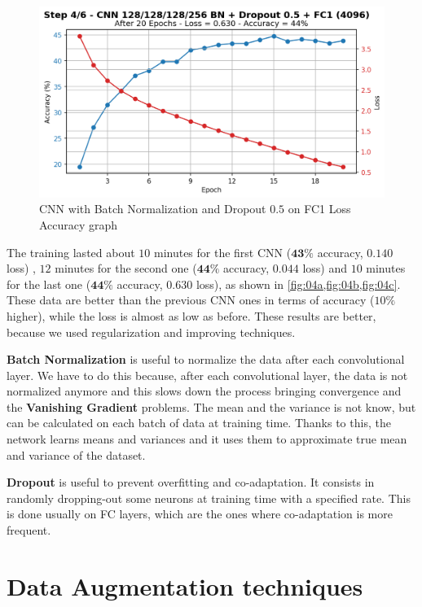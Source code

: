 \documentclass[a4paper, 11pt]{article}
\begin{document}
	\begin{figure}[ht!]
		\centering
		\includegraphics[width=0.62\paperwidth]{img/fig04c.png}
		\caption{CNN with Batch Normalization and Dropout $0.5$ on FC1 Loss Accuracy graph}
		\label{fig:04c}
	\end{figure}
	\FloatBarrier
	\newpage
	The training lasted about $10$ minutes for the first CNN ($\boldsymbol{43\%}$ accuracy, $\boldsymbol{0.140}$ loss)  , $12$ minutes for the second one ($\boldsymbol{44\%}$ accuracy, $\boldsymbol{0.044}$ loss) and $10$ minutes for the last one ($\boldsymbol{44\%}$ accuracy, $\boldsymbol{0.630}$ loss), as shown in \vref{fig:04a,fig:04b,fig:04c}.
	These data are better than the previous CNN ones in terms of accuracy ($10\%$ higher), while the loss is almost as low as before. 
	These results are better, because we used regularization and improving techniques.
	
	\textbf{Batch Normalization} is useful to normalize the data after each convolutional layer. We have to do this because, after each convolutional layer, the data is not normalized anymore and this slows down the process bringing convergence and the \textbf{Vanishing Gradient} problems. The mean and the variance is not know, but can be calculated on each batch of data at training time. Thanks to this, the network  learns means and variances and it uses them to approximate true mean and variance of the dataset.
	
	\textbf{Dropout} is useful to prevent overfitting and co-adaptation. It consists in randomly dropping-out some neurons at training time with a specified rate. This is done usually on FC layers, which are the ones where co-adaptation is more frequent. 
	
	\section{Data Augmentation techniques}
	
\end{document}
